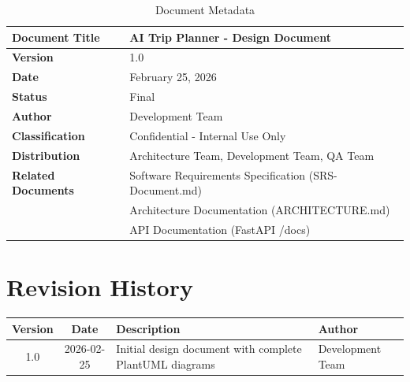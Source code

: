 \documentclass[12pt,a4paper]{report}
\begin{document}
\begin{table}[H]
\centering
\begin{tabular}{|l|p{10cm}|}
\hline
\textbf{Document Title} & AI Trip Planner - Design Document \\
\hline
\textbf{Version} & 1.0 \\
\hline
\textbf{Date} & February 25, 2026 \\
\hline
\textbf{Status} & Final \\
\hline
\textbf{Author} & Development Team \\
\hline
\textbf{Classification} & Confidential - Internal Use Only \\
\hline
\textbf{Distribution} & Architecture Team, Development Team, QA Team \\
\hline
\textbf{Related Documents} & Software Requirements Specification (SRS-Document.md) \\
& Architecture Documentation (ARCHITECTURE.md) \\
& API Documentation (FastAPI /docs) \\
\hline
\end{tabular}
\caption*{Document Metadata}
\end{table}

\section*{Revision History}

\begin{table}[H]
\centering
\begin{tabular}{|c|c|p{7cm}|p{3cm}|}
\hline
\textbf{Version} & \textbf{Date} & \textbf{Description} & \textbf{Author} \\
\hline
1.0 & 2026-02-25 & Initial design document with complete PlantUML diagrams & Development Team \\
\hline
\end{tabular}
\end{table}


\tableofcontents
\listoffigures
\listoftables
\lstlistoflistings

\end{document}
